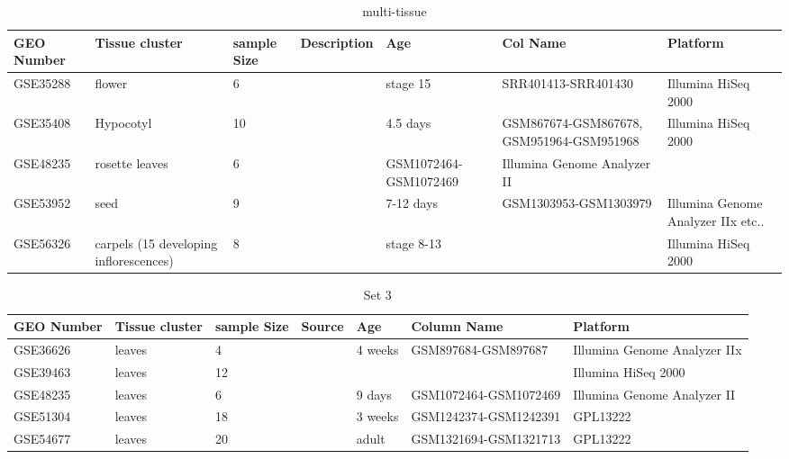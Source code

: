 \documentclass[letterpaper,12pt]{article}
\begin{document}
\begin{landscape}
\begin{table}
\footnotesize
\centering
\caption{multi-tissue}
\begin{tabular}{p{2cm}p{3cm}p{1cm}p{2cm}p{1.5cm}p{3cm}p{4cm}} \hline
GEO Number &Tissue cluster & sample Size & Description & Age  &Col Name & Platform\\ \hline
 GSE35288 &flower &6  &   &  stage 15  &SRR401413-SRR401430 &Illumina HiSeq 2000 \\ \hline
GSE35408 &Hypocotyl & 10 & & 4.5 days  & GSM867674-GSM867678, GSM951964-GSM951968  & Illumina HiSeq 2000 \\ \hline
GSE48235 &rosette leaves & 6  &  & GSM1072464-GSM1072469  &Illumina Genome Analyzer II \\	\hline
GSE53952 &seed   & 9 	& & 7-12 days & GSM1303953-GSM1303979 &Illumina Genome Analyzer IIx etc.. \\  \hline
GSE56326 &carpels (15 developing inflorescences) & 8 & &stage 8-13&  & 	Illumina HiSeq 2000 \\ \hline
\end{tabular} 
\end{table}
\end{landscape}


\begin{landscape}

\begin{table}
	\caption{Set 3}
	\footnotesize
	\centering
	\begin{tabular}{p{2cm}p{3cm}p{1cm}p{2cm}p{1.5cm}p{3cm}p{4cm}} \hline
		GEO Number &Tissue cluster & sample Size & Source & Age  &Column Name & Platform\\ \hline
		GSE36626 &leaves & 4 &   & 4 weeks &GSM897684-GSM897687 & Illumina Genome Analyzer IIx \\ \hline
		GSE39463 &leaves  &12		& & & &Illumina HiSeq 2000 \\ \hline
		GSE48235 &leaves & 6  &  & 9 days & GSM1072464-GSM1072469  &Illumina Genome Analyzer II \\	\hline
		GSE51304 &leaves  & 18 & & 3 weeks & GSM1242374-GSM1242391 &GPL13222 \\ \hline
		GSE54677 & leaves   &20  & &adult & GSM1321694-GSM1321713	 &	GPL13222\\ \hline
	\end{tabular} 
\end{table}
\end{landscape}






\end{document}
